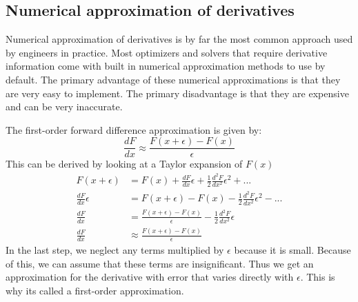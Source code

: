 \documentclass[conf]{new-aiaa}
\begin{document}

    \subsection{Numerical approximation of derivatives}
    Numerical approximation of derivatives is by far the most common approach used by engineers in practice. 
    Most optimizers and solvers that require derivative information come with built in numerical approximation methods to use by default. 
    The primary advantage of these numerical approximations is that they are very easy to implement.
    The primary disadvantage is that they are expensive and can be very inaccurate. 

    The first-order forward difference approximation is given by: 
    \begin{equation}
        \frac{dF}{dx} \approx \frac{F(x+\epsilon) - F(x)}{\epsilon}
    \end{equation}
    This can be derived by looking at a Taylor expansion of $F(x)$
    \begin{align}
        F(x+\epsilon) &= F(x) + \frac{dF}{dx}\epsilon + \frac{1}{2}\frac{d^2F}{dx^2}\epsilon^2 + ... \\
        \frac{dF}{dx}\epsilon &= F(x+\epsilon) - F(x) - \frac{1}{2}\frac{d^2F}{dx^2}\epsilon^2 - ... \\
        \frac{dF}{dx} &= \frac{F(x+\epsilon) - F(x)}{\epsilon} - \frac{1}{2}\frac{d^2F}{dx^2}\epsilon \\
        \frac{dF}{dx} &\approx \frac{F(x+\epsilon) - F(x)}{\epsilon}
    \end{align}
    In the last step, we neglect any terms multiplied by $\epsilon$ because it is small. Because of this, we can assume that these terms are insignificant. 
    Thus we get an approximation for the derivative with error that varies directly with $\epsilon$. 
    This is why its called a first-order approximation. 
\end{document}
